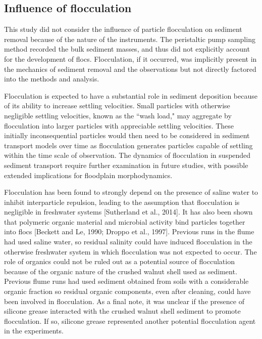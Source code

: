 \documentclass[12pt]{article}
\begin{document}
\subsection{Influence of flocculation}

This study did not consider the influence of particle flocculation on sediment removal because of the nature of the instruments. The peristaltic pump sampling method recorded the bulk sediment masses, and thus did not explicitly account for the development of flocs. Flocculation, if it occurred, was implicitly present in the mechanics of sediment removal and the observations but not directly factored into the methods and analysis.

Flocculation is expected to have a substantial role in sediment deposition because of its ability to increase settling velocities. Small particles with otherwise negligible settling velocities, known as the ``wash load," may aggregate by flocculation into larger particles with appreciable settling velocities. These initially inconsequential particles would then need to be considered in sediment transport models over time as flocculation generates particles capable of settling within the time scale of observation. The dynamics of flocculation in suspended sediment transport require further examination in future studies, with possible extended implications for floodplain morphodynamics.

Flocculation has been found to strongly depend on the presence of saline water to inhibit interparticle repulsion, leading to the assumption that flocculation is negligible in freshwater systems [Sutherland et al., 2014]. It has also been shown that polymeric organic material and microbial activity bind particles together into flocs [Beckett and Le, 1990; Droppo et al., 1997]. Previous runs in the flume had used saline water, so residual salinity could have induced flocculation in the otherwise freshwater system in which flocculation was not expected to occur. The role of organics could not be ruled out as a potential source of flocculation because of the organic nature of the crushed walnut shell used as sediment. Previous flume runs had used sediment obtained from soils with a considerable organic fraction so residual organic components, even after cleaning, could have been involved in flocculation. As a final note, it was unclear if the presence of silicone grease interacted with the crushed walnut shell sediment to promote flocculation. If so, silicone grease represented another potential flocculation agent in the experiments.
\end{document}
